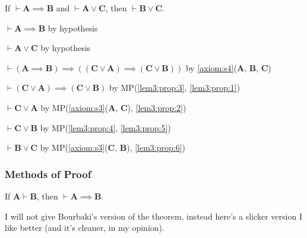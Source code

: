 \documentclass{amsart}%
\newcommand\metavariable[1]{\boldsymbol{#1}}
\begin{document}
\begin{lemma}\label{lem3:prop}
If $\vdash\metavariable{A}\implies\metavariable{B}$
and $\vdash\metavariable{A}\lor\metavariable{C}$,
then $\vdash\metavariable{B}\lor\metavariable{C}$.
\end{lemma}
\begin{pf}
\item\label{lem3:prop:1} $\vdash\metavariable{A}\implies\metavariable{B}$ by hypothesis
\item\label{lem3:prop:2} $\vdash\metavariable{A}\lor\metavariable{C}$ by hypothesis
\item\label{lem3:prop:3} $\vdash(\metavariable{A}\implies\metavariable{B})\implies((\metavariable{C}\lor\metavariable{A})\implies(\metavariable{C}\lor\metavariable{B}))$
  by \ref{axiom:s4}($\metavariable{A}$, $\metavariable{B}$, $\metavariable{C}$)
\item\label{lem3:prop:4} $\vdash(\metavariable{C}\lor\metavariable{A})\implies(\metavariable{C}\lor\metavariable{B})$
  by MP(\ref{lem3:prop:3}, \ref{lem3:prop:1})
\item\label{lem3:prop:5} $\vdash\metavariable{C}\lor\metavariable{A}$ by MP(\ref{axiom:s3}($\metavariable{A}$, $\metavariable{C}$), \ref{lem3:prop:2})
\item\label{lem3:prop:6} $\vdash\metavariable{C}\lor\metavariable{B}$
  by MP(\ref{lem3:prop:4}, \ref{lem3:prop:5})
\item\label{lem3:prop:7} $\vdash\metavariable{B}\lor\metavariable{C}$
  by MP(\ref{axiom:s3}($\metavariable{C}$, $\metavariable{B}$), \ref{lem3:prop:6})
\end{pf}



\subsubsection{Methods of Proof}

\begin{dc}\label{dc:14}
If $\metavariable{A}\vdash\metavariable{B}$, then $\vdash\metavariable{A}\implies\metavariable{B}$.
\end{dc}

I will not give Bourbaki's version of the theorem, instead here's a
slicker version I like better (and it's cleaner, in my opinion).
\end{document}
